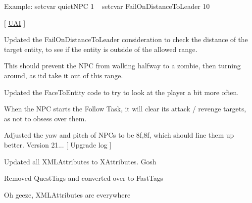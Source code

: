 Example\+: setcvar quiet\+NPC 1 ~\newline
 setcvar Fail\+On\+Distance\+To\+Leader 10

\mbox{[} \mbox{\hyperlink{namespace_u_a_i}{UAI}} \mbox{]}
\begin{DoxyItemize}
\item Updated the Fail\+On\+Distance\+To\+Leader consideration to check the distance of the target entity, to see if the entity is outside of the allowed range.
\begin{DoxyItemize}
\item This should prevent the NPC from walking halfway to a zombie, then turning around, as it\textquotesingle{}d take it out of this range.
\end{DoxyItemize}
\item Updated the Face\+To\+Entity code to try to look at the player a bit more often.
\item When the NPC starts the Follow Task, it will clear its attack / revenge targets, as not to obsess over them.
\item Adjusted the yaw and pitch of NPCs to be 8f,8f, which should line them up better. Version 21... \mbox{[} Upgrade log \mbox{]}
\item Updated all XMLAttributes to XAttributes. Gosh
\item Removed Quest\+Tags and converted over to Fast\+Tags
\item Oh geeze, XMLAttributes are everywhere
\end{DoxyItemize}


